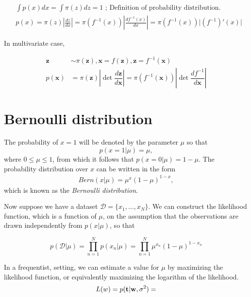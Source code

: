 $$
\begin{aligned}
& \int p(x)dx = \int \pi(z)dz = 1 \scriptstyle{\text{   ; Definition of probability distribution.}}\\
& p(x) = \pi(z) \left\vert\frac{dz}{dx}\right\vert = \pi(f^{-1}(x)) \left\vert\frac{d f^{-1}(x)}{dx}\right\vert = \pi(f^{-1}(x)) \vert (f^{-1})'(x) \vert
\end{aligned}$$

In multivariate case, 

\begin{align}
\mathbf{z} &\sim \pi(\mathbf{z}), \mathbf{x} = f(\mathbf{z}), \mathbf{z} = f^{-1}(\mathbf{x}) \\
p(\mathbf{x}) 
&= \pi(\mathbf{z}) \left\vert \det \dfrac{d \mathbf{z}}{d \mathbf{x}} \right\vert  
= \pi(f^{-1}(\mathbf{x})) \left\vert \det \dfrac{d f^{-1}}{d \mathbf{x}} \right\vert
\end{align}

\section{Bernoulli distribution}
\label{sec:bernoulli}

The probability of $x=1$ will be denoted by the parameter $\mu$ so that 
$$p(x=1|\mu) = \mu,$$
where $0 \leq \mu \leq 1$, from which it follows that $p(x=0|\mu) = 1-\mu$. The probability distribution over $x$ can be written in the form 
\begin{align}
	Bern(x|\mu) = \mu^x(1-\mu)^{1-x},
	\label{eq:bernoulli}
\end{align}
which is known as the \textit{Bernoulli distribution}.  

Now suppose we have a dataset $\mathcal{D} = \{x_1, \dots, x_{N}\}$. We can construct the likelihood function, which is a function of $\mu$, on the assumption that the observations are drawn independently from $p(x|\mu)$, so that

$$p(\mathcal{D}|\mu) = \prod_{n=1}^Np(x_n|\mu)= \prod_{n=1}^N\mu^{x_n}(1-\mu)^{1-x_n}$$

In a frequentist, setting, we can estimate a value for $\mu$ by maximizing the likelihood function, or equivalently maximizing the logarithm of the likelihood. 
$$L(w) = p({\mathbf{t}}|{\mathbf{w}}, \sigma^2) = $$


